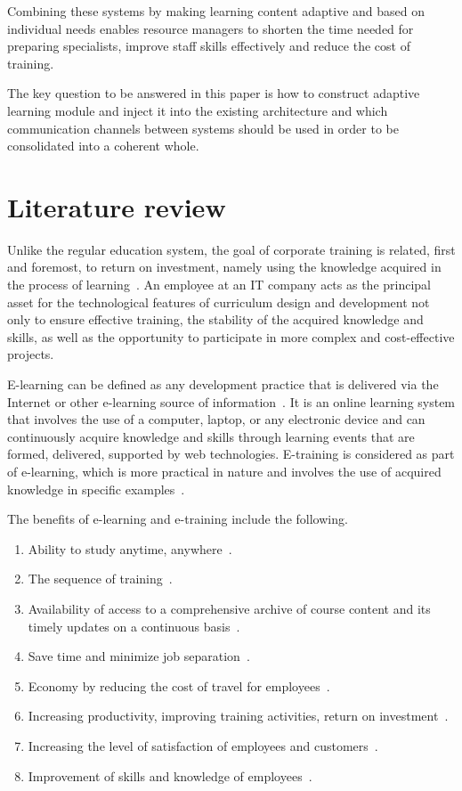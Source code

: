 \documentclass[a4paper,14pt,oneside,final]{extarticle}
\begin{document}
Combining these systems by making learning content adaptive and based on individual needs enables resource managers to shorten the time needed for preparing specialists, improve staff skills effectively and reduce the cost of training. 

The key question to be answered in this paper is how to construct adaptive learning module and inject it into the existing architecture and which communication channels between systems should be used in order to be consolidated into a coherent whole.

\section{Literature review}
Unlike the regular education system, the goal of corporate training is related, first and foremost, to return on investment, namely using the knowledge acquired in the process of learning~\cite{Bakar2017KnowledgeRI}. An employee at an IT company acts as the principal asset for the technological features of curriculum design and development not only to ensure effective training, the stability of the acquired knowledge and skills, as well as the opportunity to participate in more complex and cost-effective projects. 

E-learning can be defined as any development practice that is delivered via the Internet or other e-learning source of information~\cite{HaveYouGot}. It is an online learning system that involves the use of a computer, laptop, or any electronic device and can continuously acquire knowledge and skills through learning events that are formed, delivered, supported by web technologies. E-training is considered as part of e-learning, which is more practical in nature and involves the use of acquired knowledge in specific examples~\cite{Pedro}.

The benefits of e-learning and e-training include the following.
\begin{enumerate}
    \item Ability to study anytime, anywhere~\cite{Successful,Implementing,Batalla-Busquets2013}.
    \item The sequence of training~\cite{Implementing}.
    \item Availability of access to a comprehensive archive of course content and its timely updates on a continuous basis~\cite{Successful,Batalla-Busquets2013}.
    \item Save time and minimize job separation~\cite{Burgess2003}.
    \item Economy by reducing the cost of travel for employees~\cite{Successful,Implementing}.
    \item Increasing productivity, improving training activities, return on investment~\cite{Successful,Burgess2003}.
    \item Increasing the level of satisfaction of employees and customers~\cite{Implementing,Gwebu2007}.
    \item Improvement of skills and knowledge of employees~\cite{Successful,Implementing}.
\end{enumerate}
\end{document}
